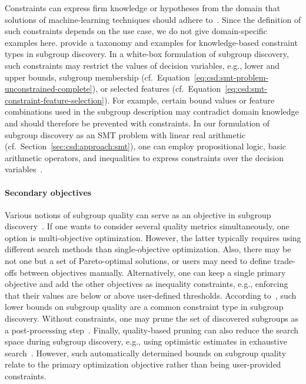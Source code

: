 \documentclass{article}
\theoremstyle{definition}
\begin{document}
Constraints can express firm knowledge or hypotheses from the domain that solutions of machine-learning techniques should adhere to~\cite{bach2022empirical}.
Since the definition of such constraints depends on the use case, we do not give domain-specific examples here.
\cite{atzmueller2006methodological, atzmueller2005exploiting, atzmueller2007using} provide a taxonomy and examples for knowledge-based constraint types in subgroup discovery.
In a white-box formulation of subgroup discovery, such constraints may restrict the values of decision variables, e.g., lower and upper bounds, subgroup membership (cf.~Equation~\ref{eq:csd:smt-problem-unconstrained-complete}), or selected features (cf.~Equation~\ref{eq:csd:smt-constraint-feature-selection}).
For example, certain bound values or feature combinations used in the subgroup description may contradict domain knowledge and should therefore be prevented with constraints.
In our formulation of subgroup discovery as an SMT problem with linear real arithmetic (cf.~Section~\ref{sec:csd:approach:smt}), one can employ propositional logic, basic arithmetic operators, and inequalities to express constraints over the decision variables~\cite{barrett2018satisfiability}.

\paragraph{Secondary objectives}

Various notions of subgroup quality can serve as an objective in subgroup discovery~\cite{atzmueller2015subgroup, herrera2011overview}.
If one wants to consider several quality metrics simultaneously, one option is multi-objective optimization.
However, the latter typically requires using different search methods than single-objective optimization.
Also, there may be not one but a set of Pareto-optimal solutions, or users may need to define trade-offs between objectives manually.
Alternatively, one can keep a single primary objective and add the other objectives as inequality constraints, e.g., enforcing that their values are below or above user-defined thresholds.
According to~\cite{meeng2021real}, such lower bounds on subgroup quality are a common constraint type in subgroup discovery.
Without constraints, one may prune the set of discovered subgroups as a post-processing step~\cite{atzmueller2015subgroup}.
Finally, quality-based pruning can also reduce the search space during subgroup discovery, e.g., using optimistic estimates in exhaustive search~\cite{atzmueller2015subgroup, atzmueller2009fast, grosskreutz2009subgroup}.
However, such automatically determined bounds on subgroup quality relate to the primary optimization objective rather than being user-provided constraints.
\end{document}
